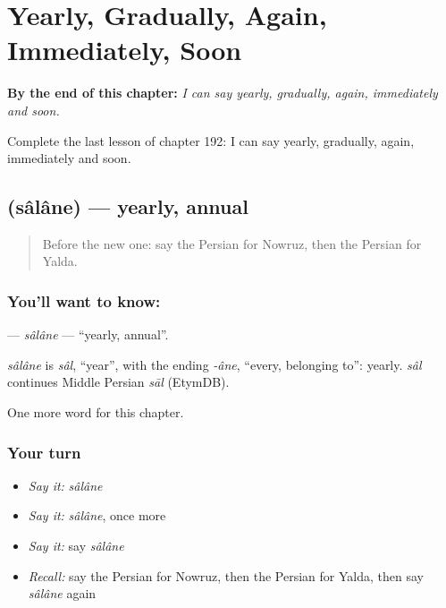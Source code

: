 
\chapter{Yearly, Gradually, Again, Immediately, Soon}
\label{ch:fa-yearly-gradually-again-immediately-soon}

\begin{chapteropening}
\textbf{By the end of this chapter:} \emph{I can say yearly, gradually, again, immediately and soon.}

Complete the last lesson of chapter 192: I can say yearly, gradually, again, immediately and soon.
\end{chapteropening}

\section[\texorpdfstring{\fa{سالانه} (sâlâne)}{سالانه (sâlâne)}]{ (sâlâne) — yearly, annual}

\label{lesson:FA-C192-salane}



\begin{quote}
Before the new one: say the Persian for Nowruz, then the Persian for Yalda.
\end{quote}

\subsection*{You'll want to know: }
\textbf{} — \emph{sâlâne} — \textquotedblleft{}yearly, annual\textquotedblright{}.

\begin{cousinweb}
\emph{sâlâne} is \emph{sâl}, \textquotedblleft{}year\textquotedblright{}, with the ending \emph{-âne}, \textquotedblleft{}every, belonging to\textquotedblright{}: yearly. \emph{sâl} continues Middle Persian \emph{sāl} (EtymDB).
\end{cousinweb}

\begin{grammarlens}[title={What you've built}]
One more word for this chapter.
\end{grammarlens}

\subsection*{Your turn}
\begin{itemize}
\raggedright
  \item \emph{Say it:} \emph{sâlâne}
  \item \emph{Say it:} \emph{sâlâne}, once more
  \item \emph{Say it:} say \emph{sâlâne}
  \item \emph{Recall:} say the Persian for Nowruz, then the Persian for Yalda, then say \emph{sâlâne} again
\end{itemize}

